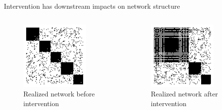 \documentclass[aspectratio=169]{beamer}
\theoremstyle{remark}
\begin{document}
\begin{frame}{Intervention has downstream impacts on network structure}
    \begin{columns}
        \begin{column}{0.5\textwidth}
            \begin{figure}
                \centering
                \includegraphics[width=0.8\textwidth]{figures/canonical-intervention/a-untreated.pdf}
                \caption{Realized network before intervention}
            \end{figure}
        \end{column}
        \begin{column}{0.5\textwidth}
            \begin{figure}
                \centering
                \includegraphics[width=0.8\textwidth]{figures/canonical-intervention/a-treated.pdf}
                \caption{Realized network after intervention}
            \end{figure}
        \end{column}
    \end{columns}
\end{frame}
\end{document}
